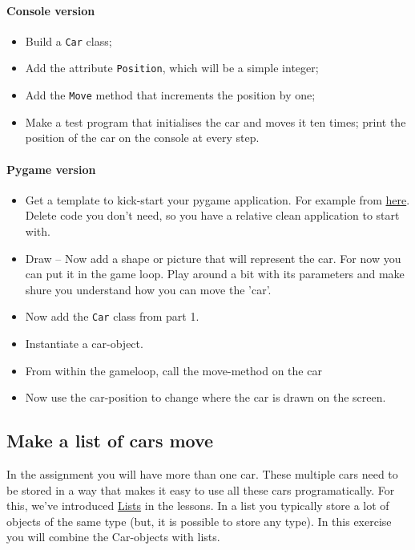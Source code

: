         \paragraph*{Console version}
        \begin{itemize}
            \item Build a \texttt{Car} class;
            \item Add the attribute \texttt{Position}, which will be a simple integer;
            \item Add the \texttt{Move} method that increments the position by one;
            \item Make a test program that initialises the car and moves it ten times; print the position of the car on the console at every step.
        \end{itemize}

        \paragraph*{Pygame version}
        \begin{itemize}
            \item Get a template to kick-start your pygame application.
            For example from \href{http://openbookproject.net/thinkcs/python/english3e/pygame.html}{here}.
            Delete code you don't need, so you have a relative clean application to start with.
            \item Draw -- Now add a shape or picture that will represent the car.
            For now you can put it in the game loop.
            Play around a bit with its parameters and make shure you understand how you can move the 'car'.
            \item Now add the \texttt{Car} class from part 1.
            \item Instantiate a car-object.
            \item From within the gameloop, call the move-method on the car
            \item Now use the car-position to change where the car is drawn on the screen.
        \end{itemize}



    \subsection{Make a list of cars move}
        In the assignment you will have more than one car.
        These multiple cars need to be stored in a way that makes it easy to use all these cars programatically.
        For this, we've introduced \href{https://github.com/hogeschool/INFDEV02-2/raw/master/Slides/Lecture%20II%20-%20lists.pdf}{Lists} in the lessons.
            In a list you typically store a lot of objects of the same type (but, it is possible to store any type).
            In this exercise you will combine the Car-objects with lists.
